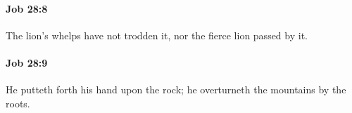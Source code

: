 		\paragraph{Job 28:8} %
			\label{JOB-28-8}

			The lion’s whelps have not trodden it, nor the fierce lion passed by it.


		\paragraph{Job 28:9} %
			\label{JOB-28-9}

			He putteth forth his hand upon the rock; he overturneth the mountains by the roots.


